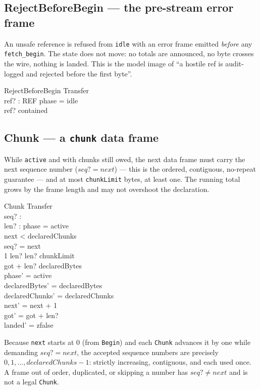 \documentclass[a4paper,10pt,fleqn]{article}
\begin{document}
\subsection{RejectBeforeBegin --- the pre-stream error frame}

An unsafe reference is refused from \texttt{idle} with an error frame emitted
\emph{before} any \texttt{fetch\_begin}. The state does not move: no totals are
announced, no byte crosses the wire, nothing is landed. This is the model image
of ``a hostile ref is audit-logged and rejected before the first byte''.

\begin{schema}{RejectBeforeBegin}
  \Xi Transfer \\
  ref? : REF
  \where
  phase = idle \\
  ref? \notin contained
\end{schema}

\subsection{Chunk --- a \texttt{chunk} data frame}

While \texttt{active} and with chunks still owed, the next data frame must carry
the next sequence number ($seq? = next$) --- this is the ordered, contiguous,
no-repeat guarantee --- and at most \texttt{chunkLimit} bytes, at least one. The
running total grows by the frame length and may not overshoot the declaration.

\begin{schema}{Chunk}
  \Delta Transfer \\
  seq? : \nat \\
  len? : \nat
  \where
  phase = active \\
  next < declaredChunks \\
  seq? = next \\
  1 \leq len? \land len? \leq chunkLimit \\
  got + len? \leq declaredBytes \\
  phase' = active \\
  declaredBytes' = declaredBytes \\
  declaredChunks' = declaredChunks \\
  next' = next + 1 \\
  got' = got + len? \\
  landed' = zfalse
\end{schema}

Because \texttt{next} starts at $0$ (from \texttt{Begin}) and each \texttt{Chunk}
advances it by one while demanding $seq? = next$, the accepted sequence numbers
are precisely $0, 1, \dots, declaredChunks - 1$: strictly increasing, contiguous,
and each used once. A frame out of order, duplicated, or skipping a number has
$seq? \neq next$ and is not a legal \texttt{Chunk}.
\end{document}
